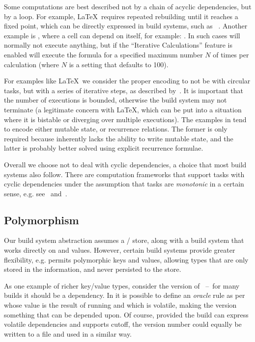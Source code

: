 Some computations are best described not by a chain of acyclic dependencies,
but by a loop. For example, \LaTeX~requires repeated rebuilding until it
reaches a fixed point, which can be directly expressed in build systems, such as
\Pluto~\cite{erdweg2015pluto}. Another example is \Excel, where a cell can
depend on itself, for example: . In such cases \Excel will
normally not execute anything, but if the ``Iterative Calculations'' feature is
enabled will execute the formula for a specified maximum number $N$ of times per
calculation (where $N$ is a setting that defaults to 100).

For examples like \LaTeX~we consider the proper encoding to not be with circular
tasks, but with a series of iterative steps, as described
by~\citet{shake-fixed-point}. It is important that the number of executions is
bounded, otherwise the build system may not terminate (a legitimate concern
with \LaTeX, which can be put into a situation where it is bistable or diverging
over multiple executions). The examples in \Excel tend to encode either mutable
state, or recurrence relations. The former is only required because \Excel
inherently lacks the ability to write mutable state, and the latter is probably
better solved using explicit recurrence formulae.

Overall we choose not to deal with cyclic dependencies, a choice that most build
systems also follow. There are computation frameworks that support tasks with
cyclic dependencies under the assumption that tasks are \emph{monotonic} in a
certain sense, e.g. see~\cite{pottier2009lazy} and~\cite{radul2009propagation}.

\subsection{Polymorphism}\label{sec-polymorphism}

Our build system abstraction assumes a / store, along with a build
system that works directly on  and  values. However, certain build
systems provide greater flexibility, e.g. \Shake permits polymorphic keys and
values, allowing types that are only stored in the \Shake information, and never
persisted to the store.

As one example of richer key/value types, consider the version of
~--~for many builds it should be a dependency. In \Shake it is possible
to define an \emph{oracle} rule as per~\cite{mitchell2012shake} whose value is
the result of running  and which is volatile, making the
 version something that can be depended upon. Of course, provided the
build can express volatile dependencies and supports cutoff, the version number
could equally be written to a file and used in a similar way.

